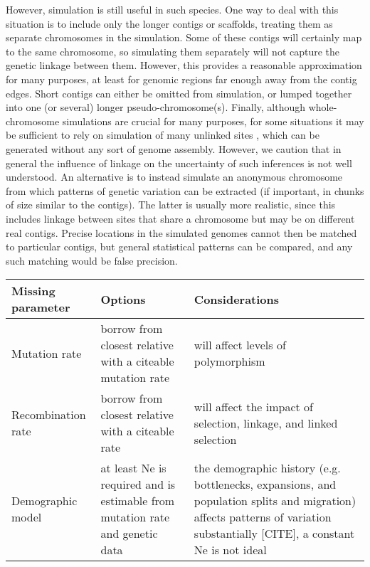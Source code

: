 \documentclass[hidelinks]{article}
\begin{document}
However, simulation is still useful in such species.
One way to deal with this situation is to include only the longer contigs or scaffolds,
treating them as separate chromosomes in the simulation.
Some of these contigs will certainly map to the same chromosome, so simulating them separately will not capture the genetic linkage between them.
However, this provides a reasonable approximation for many purposes, at least for genomic regions far enough away from the contig edges.
Short contigs can either be omitted from simulation, or lumped together into one (or several) longer pseudo-chromosome(s).
Finally, although whole-chromosome simulations are crucial for many purposes,
for some situations it may be sufficient to rely on simulation of many unlinked sites \citep{Gutenkunst2009,Excoffier2013},
which can be generated without any sort of genome assembly.
However, we caution that in general the influence of linkage on the uncertainty
of such inferences is not well understood.
An alternative is to instead simulate an anonymous chromosome from which patterns
of genetic variation can be extracted (if important, in chunks of size similar to the contigs).
The latter is usually more realistic, since this includes linkage between sites that share a chromosome but
may be on different real contigs.
Precise locations in the simulated genomes cannot then be matched to particular contigs,
but general statistical patterns can be compared,
and any such matching would be false precision.


\begin{table}[htb]
	\captionof{table}{Guide to missing parameters. \\
	\colorbox{yellow}{[TODO: reconsider table. Either clarify considerations or just defer to the text, which covers this quite clearly.}
	\colorbox{yellow}{Current version is too vague.}
} \label{tab:param-mod}
	\begin{tabular}{p{1.5in}p{2.2in}p{2.2in}}
			\hline
			Missing parameter  & Options & Considerations \\
			\hline
			Mutation rate      &
			borrow from closest relative with a citeable mutation rate &
			will affect levels of polymorphism \\
            \hline
			Recombination rate &
			borrow from closest relative with a citeable rate &
			will affect the impact of selection, linkage, and linked selection
			\\
			\hline
			Demographic model &
			at least Ne is required and is estimable from mutation rate and genetic data     &
			the demographic history (e.g. bottlenecks, expansions, and population splits and migration) affects patterns of variation substantially {[}CITE{]}, a constant Ne is not ideal \\
			\hline
	\end{tabular}
\end{table}
\end{document}
